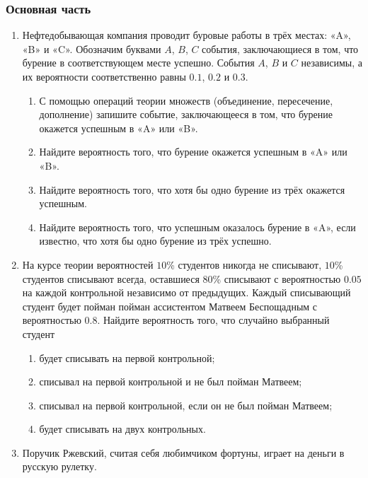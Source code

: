   
  \subsubsection*{Основная часть}
  
  \begin{enumerate}
  
  \item Нефтедобывающая компания проводит буровые работы в трёх местах: «A», «B» и «C». Обозначим буквами $A$, $B$, $C$ события, заключающиеся в том, что бурение в соответствующем месте успешно. События $A$, $B$ и $C$ независимы, а их вероятности соответственно равны $0.1$, $0.2$ и $0.3$. 
  \begin{enumerate}
  \item С помощью операций теории множеств (объединение, пересечение, дополнение) запишите событие, заключающееся в том, что бурение окажется успешным в «A» или «B». 
  \item Найдите вероятность того, что бурение окажется успешным в «A» или «B». 
  \item Найдите вероятность того, что хотя бы одно бурение из трёх окажется успешным.
  \item Найдите вероятность того, что успешным оказалось бурение в «A», если известно, что хотя бы одно бурение из трёх успешно.
  \end{enumerate}
  
  \item На курсе теории вероятностей $10$\% студентов никогда не списывают, $10$\% студентов списывают всегда, оставшиеся $80$\% списывают с вероятностью $0.05$ на каждой контрольной независимо от предыдущих. Каждый списывающий студент будет пойман пойман ассистентом Матвеем Беспощадным с вероятностью 0.8. Найдите вероятность того, что случайно выбранный студент
  \begin{enumerate}
      \item будет списывать на первой контрольной;
      \item списывал на первой контрольной и не был пойман Матвеем;
      \item списывал на первой контрольной, если он не был пойман Матвеем;
      \item будет списывать на двух контрольных.
  \end{enumerate}
  
  
  \item 
  Поручик Ржевский, считая себя любимчиком фортуны, играет на деньги в русскую рулетку. 
  

\end{enumerate}
